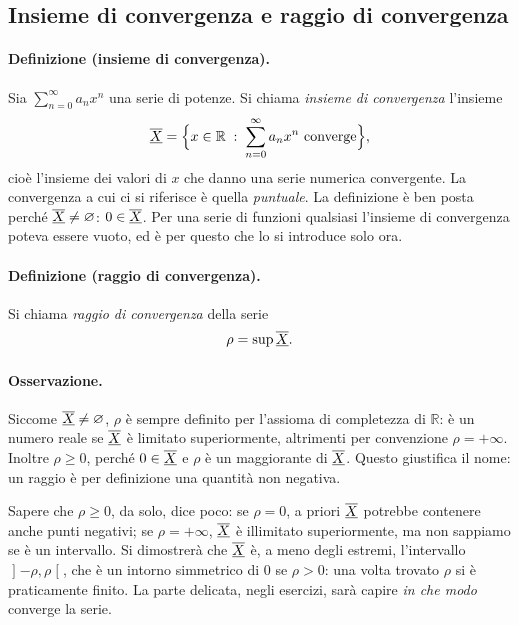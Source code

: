 \subsection{Insieme di convergenza e raggio di convergenza}

\paragraph{Definizione (insieme di convergenza).} Sia $\sum_{n=0}^{\infty}a_nx^n$
una serie di potenze. Si chiama \emph{insieme di convergenza} l'insieme
\[
  \overline{\underline{X}}=\Bigl\{x\in\mathbb{R} \;:\; \sum_{n=0}^{\infty} a_n x^n \text{ converge}\Bigr\},
\]
cioè l'insieme dei valori di $x$ che danno una serie numerica convergente. La
convergenza a cui ci si riferisce è quella \emph{puntuale}.
La definizione è ben posta perché $\overline{\underline{X}}\neq\varnothing$: $0\in \overline{\underline{X}}$. Per una serie di
funzioni qualsiasi l'insieme di convergenza poteva essere vuoto, ed è per questo
che lo si introduce solo ora.

\paragraph{Definizione (raggio di convergenza).} Si chiama \emph{raggio di
convergenza} della serie
\[
  \rho=\sup \overline{\underline{X}} .
\]

\paragraph{Osservazione.} Siccome $\overline{\underline{X}}\neq\varnothing$, $\rho$ è sempre definito per
l'assioma di completezza di $\mathbb{R}$:
è un numero reale se $\overline{\underline{X}}$ è limitato superiormente, altrimenti per convenzione
$\rho=+\infty$. Inoltre $\rho\ge 0$, perché $0\in \overline{\underline{X}}$ e $\rho$ è un maggiorante
di $\overline{\underline{X}}$.
Questo giustifica il nome: un raggio è per definizione una quantità non
negativa.

Sapere che $\rho\ge0$, da solo, dice poco: se $\rho=0$, a priori $\overline{\underline{X}}$ potrebbe
contenere anche punti negativi; se $\rho=+\infty$, $\overline{\underline{X}}$ è illimitato
superiormente, ma non sappiamo se è un intervallo. Si dimostrerà che $\overline{\underline{X}}$ è, a
meno degli estremi, l'intervallo $\mathopen{]}-\rho,\rho\mathclose{[}$, che è un
intorno simmetrico di $0$ se $\rho>0$: una volta trovato $\rho$ si è
praticamente finito.
La parte delicata, negli esercizi, sarà capire \emph{in che modo} converge la
serie.

